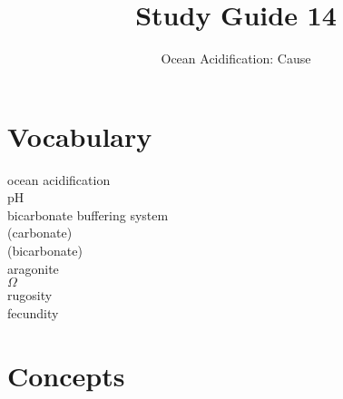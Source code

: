 \documentclass[nofonts, letterpaper]{tufte-handout}
\title{Study Guide 14}%
\author{Ocean Acidification: Cause}
\date{} %
\begin{document}
\maketitle	%


\section{Vocabulary}
\vspace{-1\baselineskip}
\begin{multicols}{2}
ocean acidification \\
pH \\
bicarbonate buffering system \\
 (carbonate) \\
 (bicarbonate) \\
aragonite \\
$\Omega$ \\
rugosity \\
fecundity 
\end{multicols}

\section{Concepts}
\end{document}
